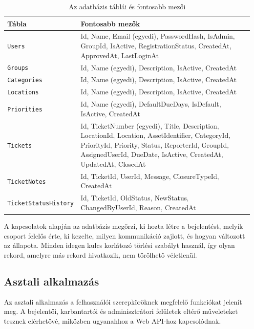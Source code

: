 \documentclass[12pt, a4paper, twoside]{article}
\begin{document}
\begin{table}[H]
    \centering
    \footnotesize
    \begin{tabular}{>{\raggedright\arraybackslash}p{3.2cm}>{\raggedright\arraybackslash}p{11.5cm}}
        \toprule
        \textbf{Tábla} & \textbf{Fontosabb mezők} \\
        \midrule
        \texttt{Users} & Id, Name, Email (egyedi), PasswordHash, IsAdmin, GroupId, IsActive, RegistrationStatus, CreatedAt, ApprovedAt, LastLoginAt \\
        \texttt{Groups} & Id, Name (egyedi), Description, IsActive, CreatedAt \\
        \texttt{Categories} & Id, Name (egyedi), Description, IsActive, CreatedAt \\
        \texttt{Locations} & Id, Name (egyedi), Description, IsActive, CreatedAt \\
        \texttt{Priorities} & Id, Name (egyedi), DefaultDueDays, IsDefault, IsActive, CreatedAt \\
        \texttt{Tickets} & Id, TicketNumber (egyedi), Title, Description, LocationId, Location, AssetIdentifier, CategoryId, PriorityId, Priority, Status, ReporterId, GroupId, AssignedUserId, DueDate, IsActive, CreatedAt, UpdatedAt, ClosedAt \\
        \texttt{TicketNotes} & Id, TicketId, UserId, Message, ClosureTypeId, CreatedAt \\
        \texttt{TicketStatusHistory} & Id, TicketId, OldStatus, NewStatus, ChangedByUserId, Reason, CreatedAt \\
        \bottomrule
    \end{tabular}
    \caption{Az adatbázis táblái és fontosabb mezői}
    \label{tab:tables}
\end{table}

A kapcsolatok alapján az adatbázis megőrzi, ki hozta létre a bejelentést, melyik csoport felelős érte, ki kezelte, milyen kommunikáció zajlott, és hogyan változott az állapota. Minden idegen kulcs korlátozó törlési szabályt használ, így olyan rekord, amelyre más rekord hivatkozik, nem törölhető véletlenül.

\subsection{Asztali alkalmazás}

Az asztali alkalmazás a felhasználói szerepköröknek megfelelő funkciókat jelenít meg. A bejelentői, karbantartói és adminisztrátori felületek eltérő műveleteket tesznek elérhetővé, miközben ugyanahhoz a Web API-hoz kapcsolódnak.
\end{document}
